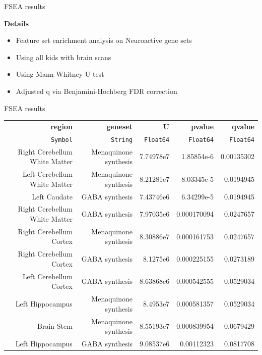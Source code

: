 \begin{frame}{FSEA results}

    \textbf{Details}
    \begin{itemize}
        \item Feature set enrichment analysis on Neuroactive gene sets
        \item Using all kids with brain scans
        \item Using Mann-Whitney U test
        \item Adjusted q via Benjamini-Hochberg FDR correction
    \end{itemize}
\end{frame}

\begin{frame}{FSEA results}

    \begin{table}
        \tiny
        \begin{tabular}{rrrrr}
            \hline\hline
            \textbf{region} & \textbf{geneset} & \textbf{U} & \textbf{pvalue} & \textbf{qvalue} \\
            \texttt{Symbol} & \texttt{String} & \texttt{Float64} & \texttt{Float64} & \texttt{Float64} \\\hline
            Right Cerebellum White Matter & Menaquinone synthesis & 7.74978e7 & 1.85854e-6 & 0.00135302 \\
            Left Cerebellum White Matter & Menaquinone synthesis & 8.21281e7 & 8.03345e-5 & 0.0194945 \\
            Left Caudate & GABA synthesis & 7.43746e6 & 6.34299e-5 & 0.0194945 \\
            Right Cerebellum White Matter & GABA synthesis & 7.97035e6 & 0.000170094 & 0.0247657 \\
            Right Cerebellum Cortex & Menaquinone synthesis & 8.30886e7 & 0.000161753 & 0.0247657 \\
            Right Cerebellum Cortex & GABA synthesis & 8.1275e6 & 0.000225155 & 0.0273189 \\
            Left Cerebellum Cortex & GABA synthesis & 8.63868e6 & 0.000542555 & 0.0529034 \\
            Left Hippocampus & Menaquinone synthesis & 8.4953e7 & 0.000581357 & 0.0529034 \\
            Brain Stem & Menaquinone synthesis & 8.55193e7 & 0.000839954 & 0.0679429 \\
            Left Hippocampus & GABA synthesis & 9.08537e6 & 0.00112323 & 0.0817708 \\

\end{tabular}
\end{table}
\end{frame}
